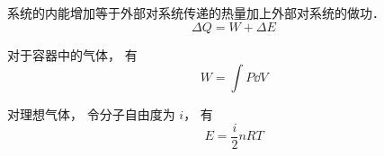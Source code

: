 
系统的内能增加等于外部对系统传递的热量加上外部对系统的做功．
\begin{equation}\label{Th1Law_eq1}
\Delta Q = W + \Delta E
\end{equation}

对于容器中的气体， 有
\begin{equation}
W = \int P \dd{V}
\end{equation}

对理想气体， 令分子自由度为 $i$， 有
\begin{equation}
E = \frac{i}{2}n RT
\end{equation}
